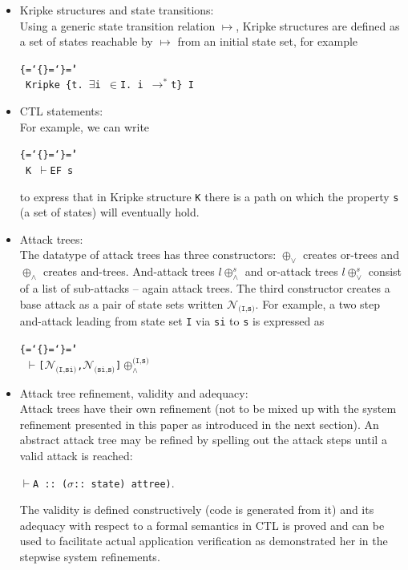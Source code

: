 \documentclass{llncs}
\newenvironment{ttbox}{\begin{alltt}\ttbraces\small\tt}%
                      {\end{alltt}}
\def\ttbraces{\let\.=\nobreak\chardef\{=`\{\chardef\}=`\}\chardef\|=`\\}
\newcommand\ttexists{\mbox{{$\exists$}}}
\newcommand\ttin{\mbox{{$\in$}}}
\newcommand\ttrelIstar{\mbox{{$\to^*$}}}
\newcommand\ttvdash{\mbox{{$\vdash$}}}
\newcommand{\ttcalN}[1]{\mbox{{${\mathcal{N}}_{\texttt{#1}}$}}}
\newcommand\ttattand[1]{\mbox{{$\oplus_{\wedge}^{#1}$}}}
\newcommand\ttattor[1]{\mbox{{$\oplus_{\vee}^{#1}$}}}
\newcommand\ttsigma{\mbox{{$\sigma$}}}
\begin{document}
\begin{itemize}
\item {Kripke structures and state transitions:}\\ 
Using a generic state transition relation $\mapsto$, Kripke structures
are defined as a set of states reachable by $\mapsto$ from an initial
state set, for example
\begin{ttbox}
Kripke \{t. \ttexists i \ttin I. i \ttrelIstar t\} I
\end{ttbox} 
\item {CTL statements:}\\ 
For example, we can write 
\begin{ttbox}
K \ttvdash {\sf EF} s
\end{ttbox}
to express that in Kripke structure \texttt{K} there is a path on which
the property \texttt{s} (a set of states) will eventually hold.
\item {Attack trees:} \\
The datatype of attack trees has three constructors: 
$\oplus_\vee$ creates or-trees and $\oplus_\wedge$ creates 
and-trees.
And-attack trees $l \ttattand s$ and or-attack trees $l \ttattor s$ 
consist of a list of sub-attacks -- again attack trees. The third constructor 
creates a base attack as a pair of state sets written \texttt{\ttcalN{(I,s)}}.
For example, a two step and-attack leading from state set \texttt{I} via
\texttt{si} to \texttt{s} is expressed as
\begin{ttbox}
\ttvdash [\ttcalN{(I,si)},\ttcalN{(si,s)}]\ttattand{\texttt{(I,s)}}
\end{ttbox}
\item {Attack tree refinement, validity and adequacy:}\\
Attack trees have their own refinement (not to be mixed up with the
system refinement presented in this paper as introduced in the next section).
An abstract attack tree may be refined by spelling out the attack steps until a valid attack
is reached:

\texttt{\ttvdash A :: (\ttsigma :: state) attree)}.

The validity is defined constructively (code is generated from it)
and its adequacy with respect to a formal semantics in CTL is proved
and can be used to facilitate actual application verification as demonstrated 
her in the stepwise system refinements.
\end{itemize}
\end{document}
